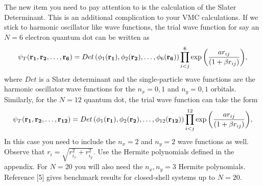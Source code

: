 \documentclass[10pt]{article}
\begin{document}
The new item you need to pay attention to is the calculation of the Slater Determinant. This is an additional complication
to your VMC calculations.
If we stick to harmonic oscillator like wave functions,
the trial wave function for say an $N=6$ electron quantum dot can be written as 
\begin{equation}
   \psi_{T}({\bf r_1},{\bf r_2},\dots, {\bf r_6}) = 
   Det\left(\phi_{1}({\bf r_1}),\phi_{2}({\bf r_2}),
   \dots,\phi_{6}({\bf r_6})\right)
   \prod_{i<j}^{6}\exp{\left(\frac{a r_{ij}}{(1+\beta r_{ij})}\right)}, 
\end{equation}
where $Det$ is a Slater determinant and the single-particle wave functions
are the harmonic oscillator wave functions for the $n_x=0,1$ and $n_y=0,1$ orbitals. 
Similarly, for the $N=12$ quantum dot, the trial wave function can take the form
\begin{equation}
   \psi_{T}({\bf r_1},{\bf r_2}, \dots,{\bf r_{12}}) = 
   Det\left(\phi_{1}({\bf r_1}),\phi_{2}({\bf r_2}),
   \dots,\phi_{12}({\bf r_{12}})\right)
   \prod_{i<j}^{12}\exp{\left(\frac{ar_{ij}}{(1+\beta r_{ij})}\right)}, 
\end{equation}
In this case you need to include the $n_x=2$ and $n_y=2$ wave functions as well.
Observe that $r_i = \sqrt{r_{i_x}^2+r_{i_y}^2}$.  Use the Hermite polynomials defined in the appendix.
For $N=20$ you will also need the $n_x,n_y=3$ Hermite polynomials.  Reference [5] gives benchmark results for closed-shell systems up to $N=20$. 
\end{document}
